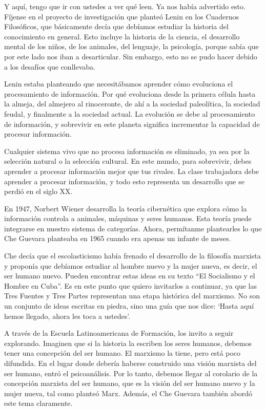 \documentclass[
  a4paper,
]{article}
\begin{document}
Y aquí, tengo que ir con ustedes a ver qué leen. Ya nos había advertido
esto. Fíjense en el proyecto de investigación que planteó Lenin en los
Cuadernos Filosóficos, que básicamente decía que debíamos estudiar la
historia del conocimiento en general. Esto incluye la historia de la
ciencia, el desarrollo mental de los niños, de los animales, del
lenguaje, la psicología, porque sabía que por este lado nos iban a
desarticular. Sin embargo, esto no se pudo hacer debido a los desafíos
que conllevaba.

Lenin estaba planteando que necesitábamos aprender cómo evoluciona el
procesamiento de información. Por qué evoluciona desde la primera célula
hasta la almeja, del almejero al rinoceronte, de ahí a la sociedad
paleolítica, la sociedad feudal, y finalmente a la sociedad actual. La
evolución se debe al procesamiento de información, y sobrevivir en este
planeta significa incrementar la capacidad de procesar información.

Cualquier sistema vivo que no procesa información es eliminado, ya sea
por la selección natural o la selección cultural. En este mundo, para
sobrevivir, debes aprender a procesar información mejor que tus rivales.
La clase trabajadora debe aprender a procesar información, y todo esto
representa un desarrollo que se perdió en el siglo XX.

En 1947, Norbert Wiener desarrolla la teoría cibernética que explora
cómo la información controla a animales, máquinas y seres humanos. Esta
teoría puede integrarse en nuestro sistema de categorías. Ahora,
permítanme plantearles lo que Che Guevara planteaba en 1965 cuando era
apenas un infante de meses.

Che decía que el escolasticismo había frenado el desarrollo de la
filosofía marxista y proponía que debíamos estudiar al hombre nuevo y la
mujer nueva, es decir, el ser humano nuevo. Pueden encontrar estas ideas
en su texto ``El Socialismo y el Hombre en Cuba''. Es en este punto que
quiero invitarlos a continuar, ya que las Tres Fuentes y Tres Partes
representan una etapa histórica del marxismo. No son un conjunto de
ideas escritas en piedra, sino una guía que nos dice: `Hasta aquí hemos
llegado, ahora les toca a ustedes'.

A través de la Escuela Latinoamericana de Formación, los invito a seguir
explorando. Imaginen que si la historia la escriben los seres humanos,
debemos tener una concepción del ser humano. El marxismo la tiene, pero
está poco difundida. En el lugar donde debería haberse construido una
visión marxista del ser humano, entró el psicoanálisis. Por lo tanto,
debemos llegar al corolario de la concepción marxista del ser humano,
que es la visión del ser humano nuevo y la mujer nueva, tal como planteó
Marx. Además, el Che Guevara también abordó este tema claramente.
\end{document}
